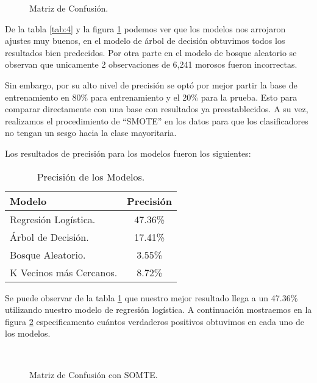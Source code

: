 \documentclass[a4paper,12pt]{article}
\begin{document}
\begin{figure}[h]
    \centering
    \caption{Matriz de Confusión.}
    \label{fig:2}
\end{figure}

De la tabla \ref{tab:4}  y la figura \ref{fig:2} podemos ver que los modelos nos arrojaron ajustes muy buenos, en el modelo de árbol de decisión obtuvimos todos los resultados bien predecidos. Por otra parte en el modelo de bosque aleatorio se observan que unicamente 2 observaciones de 6,241 morosos fueron incorrectas.

Sin embargo, por su alto nivel de precisión se optó por mejor partir la base de entrenamiento en 80\% para entrenamiento y el 20\% para la prueba. Esto para comparar directamente con una base con resultados ya preestablecidos. A su vez, realizamos el procedimiento de ``SMOTE'' en los datos para que los clasificadores no tengan un sesgo hacia la clase mayoritaria.

\newpage

Los resultados  de precisión para los modelos fueron los siguientes:

\begin{table}[h]
    \centering
    \caption{Precisión de los Modelos.}
    \begin{tabular}{lc}
    \hline
Modelo	&	Precisión	\\
\hline
Regresión Logística.	&	47.36\%	\\
Árbol de Decisión.	&	17.41\%	\\
Bosque Aleatorio.	&	3.55\%	\\
K Vecinos más Cercanos.	&	8.72\%	\\
    \hline
    \end{tabular}
    \label{tab:5}
\end{table}

Se puede observar  de la tabla \ref{tab:5} que nuestro mejor resultado llega a un 47.36\% utilizando nuestro modelo de regresión logística. A continuación mostraemos en la figura \ref{fig:3} especificamento cuántos verdaderos positivos obtuvimos en cada uno de los modelos. 

\begin{figure}[h]
    \centering
    \caption{Matriz de Confusión con SOMTE.}
    \\
    \label{fig:3}
\end{figure}
\end{document}

